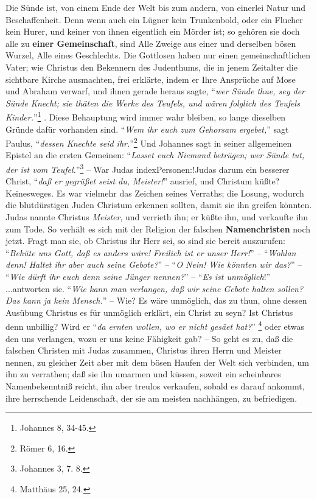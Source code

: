  Die Sünde
ist, von einem Ende der Welt bis zum andern, von einerlei Natur und
Beschaffenheit. Denn wenn auch ein Lügner kein Trunkenbold, oder ein Flucher
kein Hurer, und keiner von ihnen eigentlich ein Mörder ist; so gehören sie doch
alle zu \textbf{einer Gemeinschaft}, sind Alle Zweige aus einer und derselben
bösen Wurzel, Alle eines Geschlechts. Die Gottlosen haben nur einen
gemeinschaftlichen Vater; wie Christus den Bekennern des Judenthums, die in
jenem Zeitalter die sichtbare Kirche ausmachten, frei erklärte, indem er Ihre
Ansprüche auf Mose und Abraham  
verwarf, und ihnen gerade heraus sagte, "`\textit{wer Sünde thue, sey der Sünde
Knecht; sie thäten die Werke des Teufels, und wären folglich des Teufels
Kinder.}"'\footnote{Johannes 8, 34-45.} .
 Diese Behauptung wird immer wahr bleiben,
so lange dieselben Gründe dafür vorhanden sind. "`\textit{Wem ihr euch zum
Gehorsam ergebet,}"' sagt Paulus, "`\textit{dessen Knechte seid
ihr.}"'\footnote{Römer 6, 16.}  Und Johannes sagt
in seiner allgemeinen Epistel an die ersten Gemeinen: "`\textit{Lasset euch
Niemand betrügen; wer Sünde tut, der ist vom Teufel.}"'\footnote{Johannes 3, 7.
8.}  -- War Judas index{Personen:!Judas} darum
ein besserer Christ, "`\textit{daß er gegrüßet seist du, Meister!}"' ausrief,
und Christum küßte?
Keinesweges.
Es war vielmehr das Zeichen seines Verraths;
die Losung, wodurch die blutdürstigen Juden Christum erkennen sollten, damit sie
ihn greifen könnten. Judas nannte Christus \textit{Meister}, und verrieth ihn;
er küßte ihn, und verkaufte ihn zum Tode.
So verhält es sich mit der Religion der falschen \textbf{Namenchristen}
 noch jetzt.
Fragt man sie, ob Christus ihr Herr sei,
so sind sie bereit auszurufen:
"`\textit{Behüte uns Gott, daß es anders wäre! Freilich ist er unser Herr!}"'
-- "`\textit{Wohlan denn! Haltet ihr aber auch seine Gebote?}"'
-- "`\textit{O Nein! Wie könnten wir das?}"'
-- "`\textit{Wie dürft ihr euch denn seine Jünger nennen?}"'
-- "`\textit{Es ist unmöglich}!"'
...antworten sie.
"`\textit{Wie kann man verlangen, daß wir seine Gebote halten sollen? Das kann
ja kein Mensch.}"'
-- Wie? Es wäre unmöglich, das zu thun, ohne dessen Ausübung Christus es für
unmöglich erklärt, ein Christ zu seyn? Ist Christus denn unbillig? Wird er
"`\textit{da ernten wollen, wo er nicht gesäet hat?}"' \footnote{Matthäus 25,
24.}  oder etwas den uns verlangen, wozu er uns
keine Fähigkeit gab?
-- So geht es zu, daß die falschen Christen mit Judas zusammen, Christus ihren
Herrn und Meister nennen, zu gleicher Zeit aber mit dem bösen Haufen der Welt
sich verbinden, um ihn zu verrathen;
daß sie ihn umarmen und küssen, soweit ein scheinbares Namenbekenntniß
 reicht, ihn aber treulos verkaufen, sobald es darauf
ankommt, ihre herrschende Leidenschaft, der sie am meisten nachhängen, zu
befriedigen.


